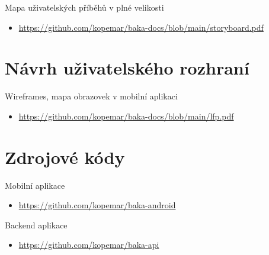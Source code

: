\documentclass[twoside]{ctuthesis}
\begin{document}
Mapa uživatelských příběhů v plné velikosti
\begin{itemize}
	\item \url{https://github.com/kopemar/baka-docs/blob/main/storyboard.pdf}
\end{itemize}


\section{Návrh uživatelského rozhraní}\label{sec:ui}

Wireframes, mapa obrazovek v mobilní aplikaci
\begin{itemize}
	\item \url{https://github.com/kopemar/baka-docs/blob/main/lfp.pdf}
\end{itemize}


\section{Zdrojové kódy}

Mobilní aplikace
\begin{itemize}
	\item \url{https://github.com/kopemar/baka-android}
\end{itemize}

Backend aplikace
\begin{itemize}
	\item \url{https://github.com/kopemar/baka-api}
\end{itemize}

\newpage
\end{document}
